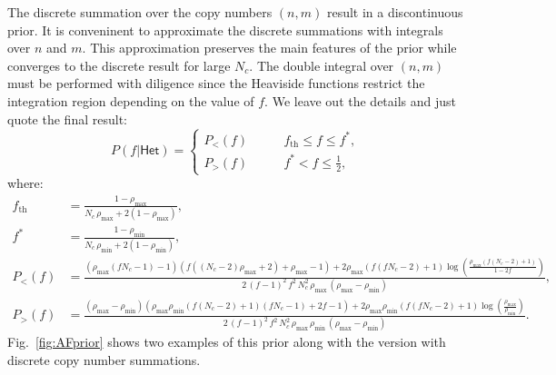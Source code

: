 \documentclass[nofootinbib,amssymb,amsmath]{revtex4}
\begin{document}
The discrete summation over the copy numbers $(n,m)$ result in a discontinuous prior. It is conveninent to approximate the discrete summations with integrals over $n$ and $m$. This approximation preserves the main features of the prior while converges to the discrete result for large $N_c$. The double integral over $(n,m)$ must be performed with diligence since the Heaviside functions restrict the integration region depending on the value of $f$. We leave out the details and just quote the final result:
\begin{equation}\label{eq:AFpriorcont}
P(f|\mathsf{Het}) = \left\{\begin{array}{ll}
  P_<(f) & \qquad f_\mathrm{th} \leq f \leq f^*,\\
  P_>(f) & \qquad f^* < f \leq \frac{1}{2},
\end{array}
\right.
\end{equation}
where:
\begin{align}
f_\mathrm{th} &= \frac{1 - \rho_\mathrm{max}}{N_c \, \rho_\mathrm{max} + 2(1-\rho_\mathrm{max})},\nonumber\\
f^* &= \frac{1 - \rho_\mathrm{min}}{N_c \, \rho_\mathrm{min} + 2(1-\rho_\mathrm{min})},\nonumber\\
P_<(f) &= \frac{(\rho_\mathrm{max} (f N_c-1)-1) (f ((N_c-2) \rho_\mathrm{max}+2)+\rho_\mathrm{max}-1)+2 \rho_\mathrm{max} (f (f N_c-2)+1) \log \left(\frac{\rho_\mathrm{max} (f (N_c-2)+1)}{1-2 f}\right)}{2 \, (f-1)^2 \, f^2 \, N_c^2 \, \rho_\mathrm{max} \, (\rho_\mathrm{max}-\rho_\mathrm{min})},\nonumber\\
P_>(f) &= \frac{(\rho_\mathrm{max}-\rho_\mathrm{min}) (\rho_\mathrm{max} \rho_\mathrm{min} (f (N_c-2)+1) (f N_c-1)+2 f-1)+2 \rho_\mathrm{max} \rho_\mathrm{min} (f (f N_c-2)+1) \log \left(\frac{\rho_\mathrm{max}}{\rho_\mathrm{min}}\right)}{2 \, (f-1)^2 \, f^2 \, N_c^2 \, \rho_\mathrm{max} \, \rho_\mathrm{min} \, (\rho_\mathrm{max}-\rho_\mathrm{min})}.
\end{align}
Fig.~\ref{fig:AFprior} shows two examples of this prior along with the version with discrete copy number summations.\\
\end{document}

